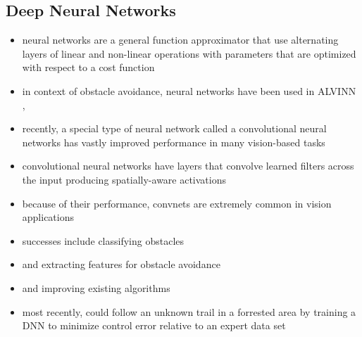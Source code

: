 \documentclass[paper=a4, fontsize=11pt]{scrartcl} %
\begin{document}
	\subsection{Deep Neural Networks}
	\begin{itemize}
		\item neural networks are a general function approximator that use alternating layers of linear and non-linear operations with parameters that are optimized with respect to a cost function
		\item in context of obstacle avoidance, neural networks have been used in ALVINN \cite{Pomerleau1989}, \cite{riedmiller2009reinforcement}
		\item recently, a special type of neural network called a convolutional neural networks \cite{DBLP:journals/corr/SzegedyLJSRAEVR14} has vastly improved performance in many vision-based tasks
		\item convolutional neural networks have layers that convolve learned filters across the input producing spatially-aware activations
		\item because of their performance, convnets are extremely common in vision applications
		\item successes include classifying obstacles \cite{Hadsell2009} 
		\item and extracting features for obstacle avoidance
		\item and improving existing algorithms \cite{Kim2015}
		\item most recently, \cite{Guisti2016} could follow an unknown trail in a forrested area by training a DNN to minimize control error relative to an expert data set
	\end{itemize}
\end{document}
